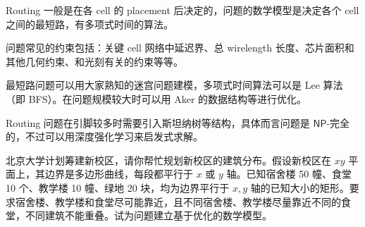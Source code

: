 \begin{problems}
        \begin{choices}
            \item Routing 一般是在各 cell 的 placement 后决定的，问题的数学模型是决定各个 cell 之间的最短路，有多项式时间的算法。
            \item 问题常见的约束包括：关键 cell 网络中延迟界、总 wirelength 长度、芯片面积和其他几何约束、和光刻有关的约束等等。
            \item 最短路问题可以用大家熟知的迷宫问题建模，多项式时间算法可以是 Lee 算法（即 BFS）。在问题规模较大时可以用 Aker 的数据结构等进行优化。
            \item Routing 问题在引脚较多时需要引入斯坦纳树等结构，具体而言问题是 $\mathsf{NP}$-完全的，不过可以用深度强化学习来启发式求解。
        \end{choices}
        \pro 北京大学计划筹建新校区，请你帮忙规划新校区的建筑分布。假设新校区在 $xy$ 平面上，其边界是多边形曲线，每段都平行于 $x$ 或 $y$ 轴。已知宿舍楼 50 幢、食堂 10 个、教学楼 10 幢、绿地 20 块，均为边界平行于 $x, y$ 轴的已知大小的矩形。要求宿舍楼、教学楼和食堂尽可能靠近，且不同宿舍楼、教学楼尽量靠近不同的食堂，不同建筑不能重叠。试为问题建立基于优化的数学模型。
    \end{problems}